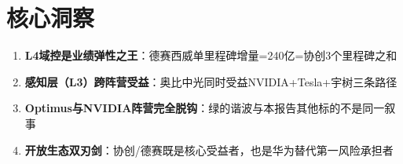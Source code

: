 \section{核心洞察}

\begin{enumerate}[leftmargin=2em]
  \item \textbf{L4域控是业绩弹性之王}：德赛西威单里程碑增量=240亿=协创3个里程碑之和
  \item \textbf{感知层（L3）跨阵营受益}：奥比中光同时受益NVIDIA+Tesla+宇树三条路径
  \item \textbf{Optimus与NVIDIA阵营完全脱钩}：绿的谐波与本报告其他标的不是同一叙事
  \item \textbf{开放生态双刃剑}：协创/德赛既是核心受益者，也是华为替代第一风险承担者
\end{enumerate}
